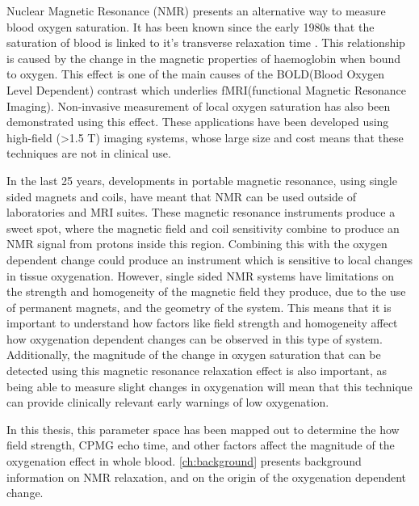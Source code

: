 Nuclear Magnetic Resonance (NMR) presents an alternative way to measure blood oxygen saturation.
It has been known since the early 1980s that the saturation of blood is linked to it's transverse relaxation time \Ttwo.
This relationship is caused by the change in the magnetic properties of haemoglobin when bound to oxygen.
This effect is one of the main causes of the BOLD(Blood Oxygen Level Dependent) contrast which underlies fMRI(functional Magnetic Resonance Imaging).
Non-invasive measurement of local oxygen saturation has also been demonstrated using this effect.
These applications have been developed using high-field (>1.5 T) imaging systems, whose large size and cost means that these techniques are not in clinical use.

In the last 25 years, developments in portable magnetic resonance, using single sided magnets and coils, have meant that NMR can be used outside of laboratories and MRI suites.
These magnetic resonance instruments produce a sweet spot, where the magnetic field and coil sensitivity combine to produce an NMR signal from protons inside this region.
Combining this with the oxygen dependent \Ttwo change could produce an instrument which is sensitive to local changes in tissue oxygenation.
However, single sided NMR systems have limitations on the strength and homogeneity of the magnetic field they produce, due to the use of permanent magnets, and the geometry of the system.
This means that it is important to understand how factors like field strength and homogeneity affect how oxygenation dependent \Ttwo changes can be observed in this type of system.
Additionally, the magnitude of the change in oxygen saturation that can be detected using this magnetic resonance relaxation effect is also important, as being able to
measure slight changes in oxygenation will mean that this technique can provide clinically relevant early warnings of low oxygenation.




\def\chapterautorefname{Chapter}

In this thesis, this parameter space has been mapped out to determine the how field strength, CPMG echo time, and other factors affect the magnitude of the oxygenation
\Ttwo effect in whole blood.
\autoref{ch:background} presents background information on NMR relaxation, and on the origin of the oxygenation dependent \Ttwo change.

\def\chapterautorefname{chapter}

